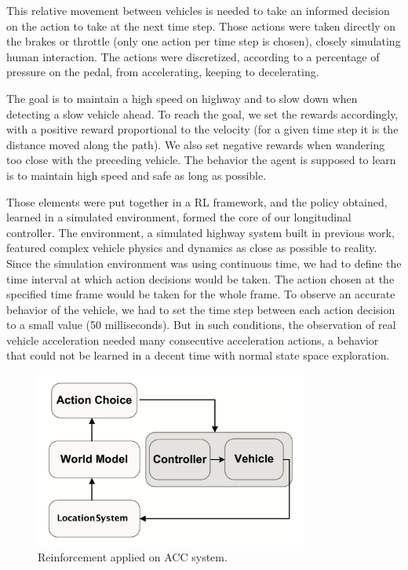 This relative movement between vehicles is needed to take an informed decision on the action to take at the next time step. Those actions were taken directly on the brakes or throttle (only one action per time step is chosen), closely simulating human interaction. The actions were discretized, according to a percentage of pressure on the pedal, from accelerating, keeping to decelerating.

The goal is to maintain a high speed on highway and to slow down when detecting a slow vehicle ahead. To reach the goal, we set the rewards accordingly, with a positive reward proportional to the velocity (for a given time step it is the distance moved along the path). We also set negative rewards when wandering too close  with the preceding vehicle. The behavior the agent is supposed to learn is to maintain high speed and safe as long as possible.

Those elements were put together in a RL framework, and the policy obtained, learned in a simulated environment, formed the core of our longitudinal controller. The environment, a simulated highway system built in previous work, featured complex vehicle physics and dynamics as close as possible to reality. Since the simulation environment was using continuous time, we had to define the time interval at which action decisions would be taken. The action chosen at the specified time frame would be taken for the whole frame. To observe an accurate behavior of the vehicle, we had to set the time step between each action decision to a small value (50 milliseconds). But in such conditions, the observation of real vehicle acceleration needed many consecutive acceleration actions, a behavior that could not be learned in a decent time with normal state space exploration. 

\begin{figure}[h]
\centering
\includegraphics[width=0.8\textwidth]{figs/ch4/acc-drl}
\caption{Reinforcement applied on ACC system.}
\label{fig:acc-rl}
\end{figure}

